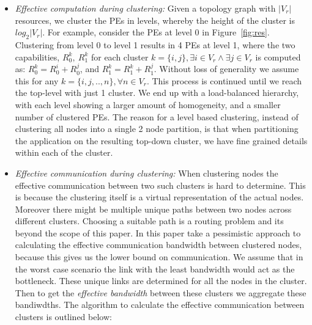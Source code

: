 \begin{itemize}

\item \textit{Effective computation during clustering:} Given a
  topology graph with $|V_r|$ resources, we cluster the PEs in levels,
  whereby the height of the cluster is $log_2|V_r|$. For example,
  consider the PEs at level 0 in Figure~\ref{fig:res}. Clustering from
  level 0 to level 1 results in 4 PEs at level 1, where the two
  capabilities, $R^k_0,\ R^k_1$ for each cluster $k = \{i, j\},
  \exists i \in V_r \wedge \exists j \in V_r$ is computed as: $R^k_0 =
  R^i_0 + R^j_0$, and $R^k_1 = R^k_1 + R^j_1$. Without loss of
  generality we assume this for any $k = \{i,j,..,n\}, \forall n \in
  V_r$. This process is continued until we reach the top-level with just
  1 cluster. We end up with a load-balanced hierarchy, with each
  level showing a larger amount of homogeneity, and a smaller number of
  clustered PEs. The reason for a level based clustering, instead of
  clustering all nodes into a single 2 node partition, is that when
  partitioning the application on the resulting top-down cluster, we
  have fine grained details within each of the cluster.



\item \textit{Effective communication during clustering:} When
  clustering nodes the effective communication between two such clusters
  is hard to determine. This is because the clustering itself is a
  virtual representation of the actual nodes. Moreover there might be
  multiple unique paths between two nodes across different
  clusters. Choosing a suitable path is a routing problem and its beyond
  the scope of this paper.  In this paper take a pessimistic approach to
  calculating the effective communication bandwidth between clustered
  nodes, because this gives us the lower bound on communication. We
  assume that in the worst case scenario the link with the least
  bandwidth would act as the bottleneck. These unique links are
  determined for all the nodes in the cluster. Then to get the
  \textit{effective bandwidth} between these clusters we aggregate these
  bandiwdths.  The algorithm to calculate the effective communication
  between clusters is outlined below:


\end{itemize}
